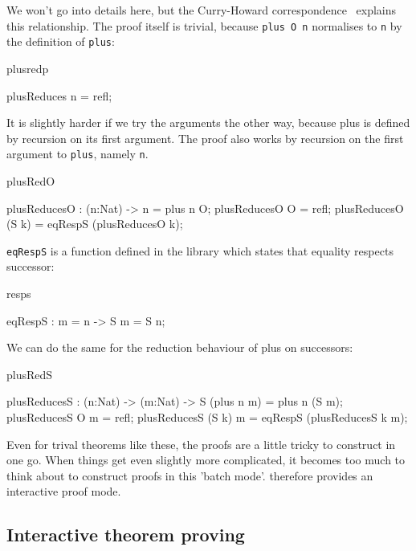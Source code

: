 We won't go into details here, but the Curry-Howard
correspondence~\cite{howard} explains this relationship.
The proof itself is trivial, because \texttt{plus O n} normalises to \texttt{n} 
by the definition of \texttt{plus}:

\begin{SaveVerbatim}{plusredp}

plusReduces n = refl;

\end{SaveVerbatim}

\noindent
It is slightly harder if we try the arguments the other way, because plus is
defined by recursion on its first argument. The proof also works by recursion
on the first argument to \texttt{plus}, namely \texttt{n}.

\begin{SaveVerbatim}{plusRedO}

plusReducesO : (n:Nat) -> n = plus n O;
plusReducesO O = refl;
plusReducesO (S k) = eqRespS (plusReducesO k);

\end{SaveVerbatim}

\noindent
\texttt{eqRespS} is a function defined in the library which states that
equality respects successor:

\begin{SaveVerbatim}{resps}

eqRespS : m = n -> S m = S n;

\end{SaveVerbatim}

\noindent
We can do the same for the reduction behaviour of plus on successors:

\begin{SaveVerbatim}{plusRedS}

plusReducesS : (n:Nat) -> (m:Nat) -> S (plus n m) = plus n (S m);
plusReducesS O m = refl;
plusReducesS (S k) m = eqRespS (plusReducesS k m);

\end{SaveVerbatim}

Even for trival theorems like these, the proofs are a little tricky to
construct in one go. When things get even slightly more complicated, it becomes
too much to think about to construct proofs in this 'batch mode'. \Idris{}
therefore provides an interactive proof mode.

\subsection{Interactive theorem proving}

